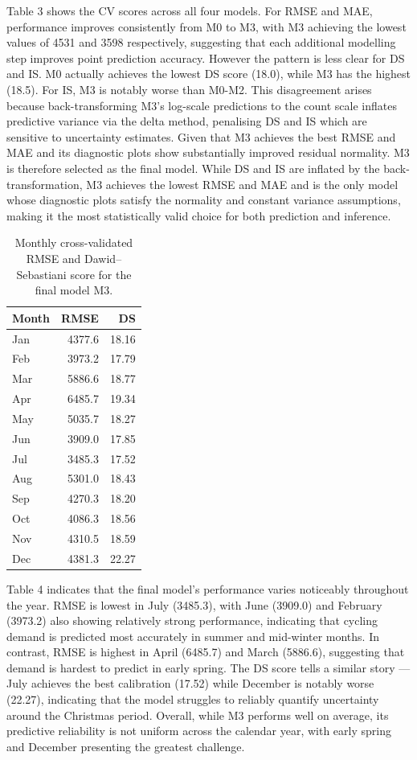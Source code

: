 \documentclass[
]{article}
\begin{document}
Table 3 shows the CV scores across all four models. For RMSE and MAE, performance improves consistently from M0 to M3, with M3 achieving the
lowest values of 4531 and 3598 respectively, suggesting that each additional modelling step improves point prediction accuracy. However
the pattern is less clear for DS and IS. M0 actually achieves the lowest DS score (18.0), while M3 has the highest (18.5). For IS, M3 is notably
worse than M0-M2. This disagreement arises because back-transforming M3's log-scale predictions to the count scale inflates predictive variance via
the delta method, penalising DS and IS which are sensitive to uncertainty estimates. Given that M3 achieves the best RMSE and MAE and its diagnostic plots show substantially improved residual normality. M3 is therefore selected as the final model. While DS and IS are inflated by the back-transformation, M3 achieves the lowest RMSE and MAE and is the only model whose diagnostic plots satisfy the normality and constant variance assumptions, making it the most statistically valid choice for both prediction and inference.

\begin{table}[!h]
\centering
\caption{\label{tab:unnamed-chunk-4}Monthly cross-validated RMSE and Dawid--Sebastiani score for the final model M3.}
\centering
\begin{tabular}[t]{lrr}
\toprule
Month & RMSE & DS\\
\midrule
Jan & 4377.6 & 18.16\\
Feb & 3973.2 & 17.79\\
Mar & 5886.6 & 18.77\\
Apr & 6485.7 & 19.34\\
May & 5035.7 & 18.27\\
\addlinespace
Jun & 3909.0 & 17.85\\
Jul & 3485.3 & 17.52\\
Aug & 5301.0 & 18.43\\
Sep & 4270.3 & 18.20\\
Oct & 4086.3 & 18.56\\
\addlinespace
Nov & 4310.5 & 18.59\\
Dec & 4381.3 & 22.27\\
\bottomrule
\end{tabular}
\end{table}

Table 4 indicates that the final model's performance varies noticeably
throughout the year. RMSE is lowest in July (3485.3), with June (3909.0)
and February (3973.2) also showing relatively strong performance,
indicating that cycling demand is predicted most accurately in summer
and mid-winter months. In contrast, RMSE is highest in April (6485.7)
and March (5886.6), suggesting that demand is hardest to predict in
early spring. The DS score tells a similar story --- July achieves the
best calibration (17.52) while December is notably worse (22.27),
indicating that the model struggles to reliably quantify uncertainty
around the Christmas period. Overall, while M3 performs well on average,
its predictive reliability is not uniform across the calendar year, with
early spring and December presenting the greatest challenge.
\end{document}
